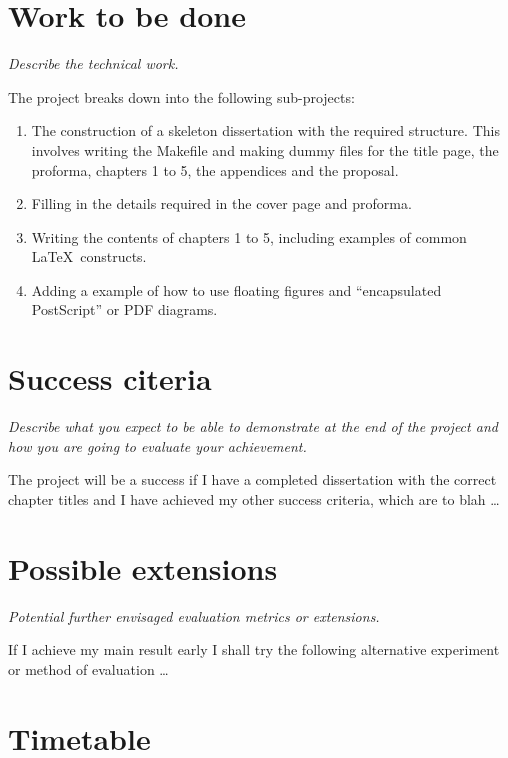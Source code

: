 \documentclass[12pt,a4paper,twoside]{article}
\begin{document}
\section*{Work to be done}

\emph{Describe the technical work.}

The project breaks down into the following sub-projects:

\begin{enumerate}

\item The construction of a skeleton dissertation with the required
  structure. This involves writing the Makefile and making dummy
  files for the title page, the proforma, chapters 1 to 5, the
  appendices and the proposal.

\item Filling in the details required in the cover page and proforma.

\item Writing the contents of chapters 1 to 5, including examples of
  common \LaTeX\ constructs.

\item Adding a example of how to use floating figures and ``encapsulated
  PostScript'' or PDF diagrams.

\end{enumerate}

\section*{Success citeria}

\emph{Describe what you expect to be able to demonstrate at the
end of the project and how you are going to evaluate your achievement.}

The project will be a success if I have a completed dissertation with
the correct chapter titles and I have achieved my other success
criteria, which are to blah \ldots


\section*{Possible extensions}

{\em Potential further envisaged evaluation metrics or extensions.}

If I achieve my main result early I shall try the following
alternative experiment or method of evaluation \ldots


\section*{Timetable}
\end{document}
